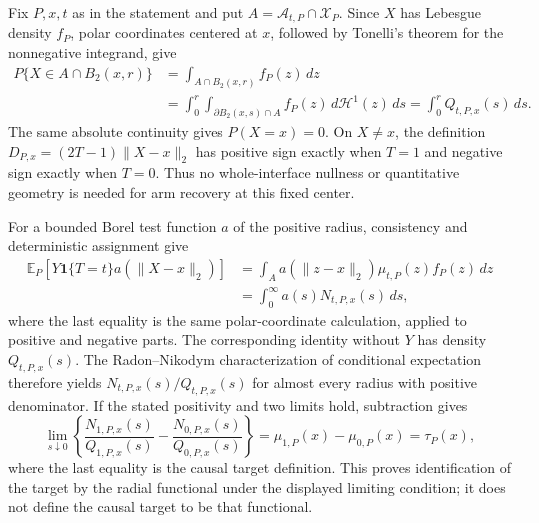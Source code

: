 Fix \(P,x,t\) as in the statement and put \(A=\mathcal A_{t,P}\cap\mathcal X_P\).  Since \(X\) has Lebesgue density \(f_P\), polar coordinates centered at \(x\), followed by Tonelli's theorem for the nonnegative integrand, give
\[
\begin{aligned}
P\{X\in A\cap B_2(x,r)\}
&=\int_{A\cap B_2(x,r)}f_P(z)\,dz\\
&=\int_0^r\int_{\partial B_2(x,s)\cap A}f_P(z)\,d\mathcal H^1(z)\,ds
=\int_0^rQ_{t,P,x}(s)\,ds.
\end{aligned}
\]
The same absolute continuity gives \(P(X=x)=0\).  On \(X\ne x\), the definition \(D_{P,x}=(2T-1)\lVert X-x\rVert_2\) has positive sign exactly when \(T=1\) and negative sign exactly when \(T=0\).  Thus no whole-interface nullness or quantitative geometry is needed for arm recovery at this fixed center.

For a bounded Borel test function \(a\) of the positive radius, consistency and deterministic assignment give
\[
\begin{aligned}
\mathbb E_P\!\left[Y\mathbf1\{T=t\}a(\lVert X-x\rVert_2)\right]
&=\int_A a(\lVert z-x\rVert_2)\mu_{t,P}(z)f_P(z)\,dz\\
&=\int_0^\infty a(s)N_{t,P,x}(s)\,ds,
\end{aligned}
\]
where the last equality is the same polar-coordinate calculation, applied to positive and negative parts.  The corresponding identity without \(Y\) has density \(Q_{t,P,x}(s)\).  The Radon--Nikodym characterization of conditional expectation therefore yields \(N_{t,P,x}(s)/Q_{t,P,x}(s)\) for almost every radius with positive denominator.  If the stated positivity and two limits hold, subtraction gives
\[
\lim_{s\downarrow0}\left\{\frac{N_{1,P,x}(s)}{Q_{1,P,x}(s)}-\frac{N_{0,P,x}(s)}{Q_{0,P,x}(s)}\right\}
=\mu_{1,P}(x)-\mu_{0,P}(x)=\tau_P(x),
\]
where the last equality is the causal target definition.  This proves identification of the target by the radial functional under the displayed limiting condition; it does not define the causal target to be that functional.